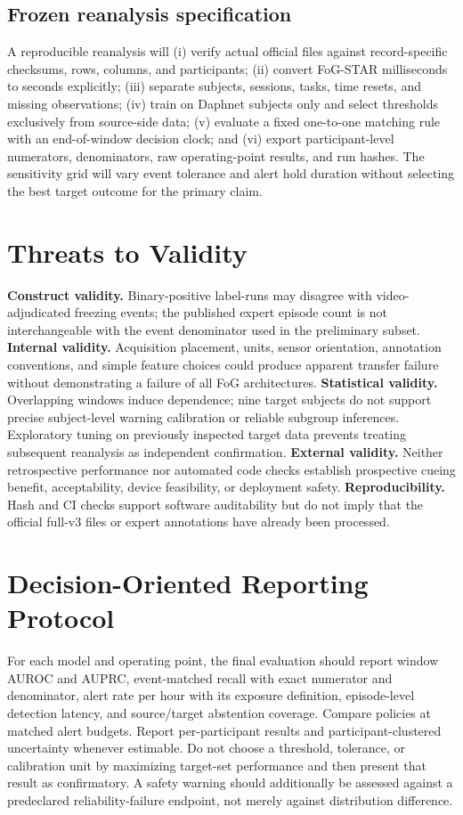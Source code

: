 \documentclass[sigconf,review,anonymous]{acmart}
\begin{document}
\subsection{Frozen reanalysis specification}
A reproducible reanalysis will (i) verify actual official files against record-specific checksums, rows, columns, and participants; (ii) convert FoG-STAR milliseconds to seconds explicitly; (iii) separate subjects, sessions, tasks, time resets, and missing observations; (iv) train on Daphnet subjects only and select thresholds exclusively from source-side data; (v) evaluate a fixed one-to-one matching rule with an end-of-window decision clock; and (vi) export participant-level numerators, denominators, raw operating-point results, and run hashes. The sensitivity grid will vary event tolerance and alert hold duration without selecting the best target outcome for the primary claim.

\section{Threats to Validity}
\textbf{Construct validity.} Binary-positive label-runs may disagree with video-adjudicated freezing events; the published expert episode count is not interchangeable with the event denominator used in the preliminary subset.
\textbf{Internal validity.} Acquisition placement, units, sensor orientation, annotation conventions, and simple feature choices could produce apparent transfer failure without demonstrating a failure of all FoG architectures.
\textbf{Statistical validity.} Overlapping windows induce dependence; nine target subjects do not support precise subject-level warning calibration or reliable subgroup inferences. Exploratory tuning on previously inspected target data prevents treating subsequent reanalysis as independent confirmation.
\textbf{External validity.} Neither retrospective performance nor automated code checks establish prospective cueing benefit, acceptability, device feasibility, or deployment safety.
\textbf{Reproducibility.} Hash and CI checks support software auditability but do not imply that the official full-v3 files or expert annotations have already been processed.

\section{Decision-Oriented Reporting Protocol}
For each model and operating point, the final evaluation should report window AUROC and AUPRC, event-matched recall with exact numerator and denominator, alert rate per hour with its exposure definition, episode-level detection latency, and source/target abstention coverage. Compare policies at matched alert budgets. Report per-participant results and participant-clustered uncertainty whenever estimable. Do not choose a threshold, tolerance, or calibration unit by maximizing target-set performance and then present that result as confirmatory. A safety warning should additionally be assessed against a predeclared reliability-failure endpoint, not merely against distribution difference.
\end{document}
